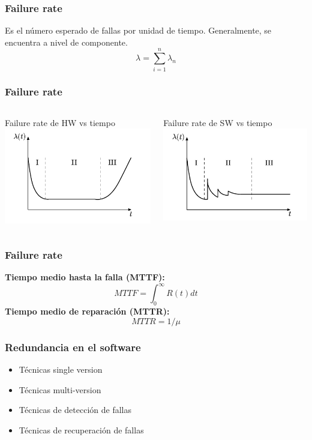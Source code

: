 \begin{frame}
	\frametitle{Failure rate}
	Es el número esperado de fallas por unidad de tiempo. Generalmente, se encuentra a nivel de componente.
	\LARGE
	$$
	\lambda =  \sum_{i=1}^{n} \lambda_n
	$$	
\end{frame}

\begin{frame}
	\frametitle{Failure rate}
	\begin{columns}[T]
		\begin{column}{.5\textwidth}
			\centering
			Failure rate de HW vs tiempo
			\includegraphics[scale=0.4]{images/bathtub_curve.png}
		\end{column}
		\begin{column}{.5\textwidth}
			\centering
			Failure rate de SW vs tiempo
			\includegraphics[scale=0.4]{images/Failure_rate_software.png}
		\end{column}
	\end{columns}
\end{frame}

\begin{frame}
	\frametitle{Failure rate}
	\textbf{Tiempo medio hasta la falla (MTTF):}
	$$ MTTF = \int_{0}^{\infty}{R(t) dt} $$
	\textbf{Tiempo medio de reparación (MTTR):}
	$$ MTTR = 1/\mu $$
\end{frame}

\begin{frame}
	\frametitle{Redundancia en el software}
	\begin{itemize}
		\item Técnicas single version
		\item Técnicas multi-version
		\item Técnicas de detección de fallas
		\item Técnicas de recuperación de fallas
	\end{itemize}
\end{frame}